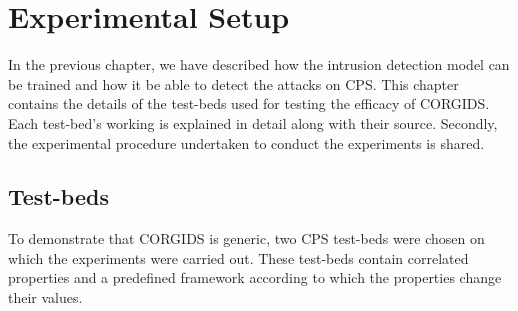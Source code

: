 
\chapter{\textbf{Experimental Setup}}
\label{sec4:ExperimentalDetail}

In the previous chapter, we have described how the intrusion detection model can be trained and how it be able to detect the attacks on \ac{CPS}. This chapter contains the details of the test-beds used for testing the efficacy of \ac{CORGIDS}. Each test-bed's working is explained in detail along with their source. Secondly, the experimental procedure undertaken to conduct the experiments is shared. 

\section{Test-beds}
To demonstrate that \ac{CORGIDS} is generic, two \ac{CPS} test-beds were chosen on which the experiments were carried out. These test-beds contain correlated properties and a predefined framework according to which the properties change their values. 

